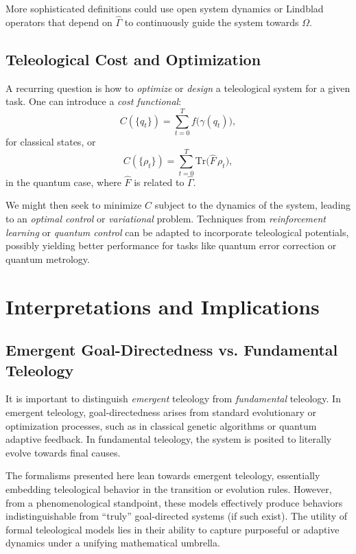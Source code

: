\documentclass[12pt]{article}
\begin{document}
More sophisticated definitions could use open system dynamics or Lindblad operators that depend on $\hat{\Gamma}$ to continuously guide the system towards $\Omega$. 

\subsection{Teleological Cost and Optimization}

A recurring question is how to \emph{optimize} or \emph{design} a teleological system for a given task. One can introduce a \emph{cost functional}:
\[
C(\{q_t\}) = \sum_{t=0}^T f\big(\gamma(q_t)\big),
\]
for classical states, or
\[
C(\{\rho_t\}) = \sum_{t=0}^T \mathrm{Tr}\big( \hat{F} \,\rho_t \big),
\]
in the quantum case, where $\hat{F}$ is related to $\hat{\Gamma}$.

We might then seek to minimize $C$ subject to the dynamics of the system, leading to an \emph{optimal control} or \emph{variational} problem. Techniques from \emph{reinforcement learning} or \emph{quantum control} can be adapted to incorporate teleological potentials, possibly yielding better performance for tasks like quantum error correction or quantum metrology.

\section{Interpretations and Implications}

\subsection{Emergent Goal-Directedness vs. Fundamental Teleology}

It is important to distinguish \emph{emergent} teleology from \emph{fundamental} teleology. In emergent teleology, goal-directedness arises from standard evolutionary or optimization processes, such as in classical genetic algorithms or quantum adaptive feedback. In fundamental teleology, the system is posited to literally evolve towards final causes. 

The formalisms presented here lean towards emergent teleology, essentially embedding teleological behavior in the transition or evolution rules. However, from a phenomenological standpoint, these models effectively produce behaviors indistinguishable from ``truly'' goal-directed systems (if such exist). The utility of formal teleological models lies in their ability to capture purposeful or adaptive dynamics under a unifying mathematical umbrella.
\end{document}
